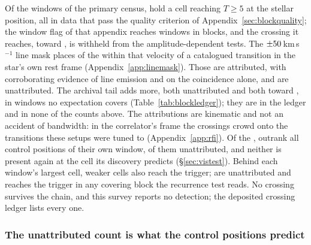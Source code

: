 Of the \NWindows{} windows of the primary census, \CsNCross{} hold a cell
reaching $T\geq5$ at the stellar position, all in data that pass the quality
criterion of Appendix~\ref{sec:blockquality}; the window flag of that appendix
reaches \DqNWin{} windows in \BkFlagNBlock{} blocks, and the
\BkFlagNCrossOther{} crossing it reaches, toward \BkFlagOtherStar, is withheld
from the amplitude-dependent tests. The $\pm50$\,km\,s$^{-1}$ line mask places \MkNCoinc{}
of the \CsNCrossQp{} within that velocity of a catalogued transition in the
star's own rest frame (Appendix~\ref{app:linemask}). Those \CsNAttrQp{} are attributed,
\LnAttrSupp{} with corroborating evidence of line emission and \LnAttrCoinc{}
on the coincidence alone, and \CsNUnattrQp{} are unattributed. The archival tail adds \CeNTailCrossWord{} more, both
unattributed and both toward \CeTailStar, in windows no expectation covers
(Table~\ref{tab:blockledger}); they are in the ledger and in none of the counts
above. The attributions are kinematic and not an accident of bandwidth: in
the correlator's frame the crossings crowd onto the transitions these setups
were tuned to (Appendix~\ref{app:rfi}). Of the \CsNCrossQp, \EvNLeadWord{} outrank all
\NCtrl{} control positions of their own window, \EvNRankQp{} of them
unattributed, and neither is present again at the cell its discovery predicts
(\S\ref{sec:vistest}). Behind each window's largest cell, \CkNSecondaryWord{}
weaker cells also reach the trigger; \CkNSecUnattrWord{} are unattributed and
\CkNRecurWord{} reaches the trigger in any covering block the recurrence test
reads. No crossing survives the chain, and this survey reports no detection; the
deposited crossing ledger lists every one.

\subsubsection{The unattributed count is what the control positions predict}
\label{sec:trigunif}

